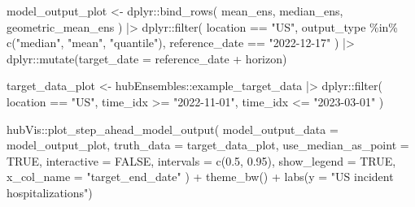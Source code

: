 \documentclass[
]{article}
\newenvironment{Shaded}{\begin{snugshade}}{\end{snugshade}}
\newcommand{\AttributeTok}[1]{\textcolor[rgb]{0.40,0.45,0.13}{#1}}
\newcommand{\ConstantTok}[1]{\textcolor[rgb]{0.56,0.35,0.01}{#1}}
\newcommand{\FloatTok}[1]{\textcolor[rgb]{0.68,0.00,0.00}{#1}}
\newcommand{\FunctionTok}[1]{\textcolor[rgb]{0.28,0.35,0.67}{#1}}
\newcommand{\NormalTok}[1]{\textcolor[rgb]{0.00,0.23,0.31}{#1}}
\newcommand{\OtherTok}[1]{\textcolor[rgb]{0.00,0.23,0.31}{#1}}
\newcommand{\SpecialCharTok}[1]{\textcolor[rgb]{0.37,0.37,0.37}{#1}}
\newcommand{\StringTok}[1]{\textcolor[rgb]{0.13,0.47,0.30}{#1}}
\begin{document}
\begin{Shaded}
\begin{Highlighting}[]
\NormalTok{model\_output\_plot }\OtherTok{\textless{}{-}}\NormalTok{ dplyr}\SpecialCharTok{::}\FunctionTok{bind\_rows}\NormalTok{(}
\NormalTok{  mean\_ens, median\_ens,}
\NormalTok{  geometric\_mean\_ens}
\NormalTok{) }\SpecialCharTok{|\textgreater{}}
\NormalTok{  dplyr}\SpecialCharTok{::}\FunctionTok{filter}\NormalTok{(}
\NormalTok{    location }\SpecialCharTok{==} \StringTok{"US"}\NormalTok{,}
\NormalTok{    output\_type }\SpecialCharTok{\%in\%} \FunctionTok{c}\NormalTok{(}\StringTok{"median"}\NormalTok{, }\StringTok{"mean"}\NormalTok{, }\StringTok{"quantile"}\NormalTok{),}
\NormalTok{    reference\_date }\SpecialCharTok{==} \StringTok{"2022{-}12{-}17"}
\NormalTok{  ) }\SpecialCharTok{|\textgreater{}}
\NormalTok{  dplyr}\SpecialCharTok{::}\FunctionTok{mutate}\NormalTok{(}\AttributeTok{target\_date =}\NormalTok{ reference\_date }\SpecialCharTok{+}\NormalTok{ horizon)}

\NormalTok{target\_data\_plot }\OtherTok{\textless{}{-}}\NormalTok{ hubEnsembles}\SpecialCharTok{::}\NormalTok{example\_target\_data }\SpecialCharTok{|\textgreater{}}
\NormalTok{  dplyr}\SpecialCharTok{::}\FunctionTok{filter}\NormalTok{(}
\NormalTok{    location }\SpecialCharTok{==} \StringTok{"US"}\NormalTok{, time\_idx }\SpecialCharTok{\textgreater{}=} \StringTok{"2022{-}11{-}01"}\NormalTok{,}
\NormalTok{    time\_idx }\SpecialCharTok{\textless{}=} \StringTok{"2023{-}03{-}01"}
\NormalTok{  )}

\NormalTok{hubVis}\SpecialCharTok{::}\FunctionTok{plot\_step\_ahead\_model\_output}\NormalTok{(}
  \AttributeTok{model\_output\_data =}\NormalTok{ model\_output\_plot,}
  \AttributeTok{truth\_data =}\NormalTok{ target\_data\_plot,}
  \AttributeTok{use\_median\_as\_point =} \ConstantTok{TRUE}\NormalTok{,}
  \AttributeTok{interactive =} \ConstantTok{FALSE}\NormalTok{,}
  \AttributeTok{intervals =} \FunctionTok{c}\NormalTok{(}\FloatTok{0.5}\NormalTok{, }\FloatTok{0.95}\NormalTok{),}
  \AttributeTok{show\_legend =} \ConstantTok{TRUE}\NormalTok{,}
  \AttributeTok{x\_col\_name =} \StringTok{"target\_end\_date"}
\NormalTok{) }\SpecialCharTok{+}
  \FunctionTok{theme\_bw}\NormalTok{() }\SpecialCharTok{+}
  \FunctionTok{labs}\NormalTok{(}\AttributeTok{y =} \StringTok{"US incident hospitalizations"}\NormalTok{)}
\end{Highlighting}
\end{Shaded}
\end{document}
